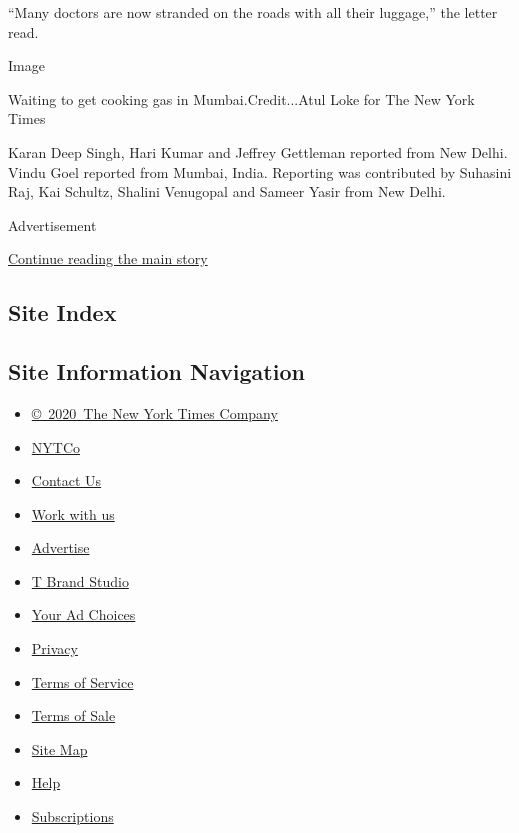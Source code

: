 ``Many doctors are now stranded on the roads with all their luggage,''
the letter read.

Image

Waiting to get cooking gas in Mumbai.Credit...Atul Loke for The New York
Times

Karan Deep Singh, Hari Kumar and Jeffrey Gettleman reported from New
Delhi. Vindu Goel reported from Mumbai, India. Reporting was contributed
by Suhasini Raj, Kai Schultz, Shalini Venugopal and Sameer Yasir from
New Delhi.

Advertisement

\protect\hyperlink{after-bottom}{Continue reading the main story}

\hypertarget{site-index}{%
\subsection{Site Index}\label{site-index}}

\hypertarget{site-information-navigation}{%
\subsection{Site Information
Navigation}\label{site-information-navigation}}

\begin{itemize}
\tightlist
\item
  \href{https://help.nytimes.com/hc/en-us/articles/115014792127-Copyright-notice}{©~2020~The
  New York Times Company}
\end{itemize}

\begin{itemize}
\tightlist
\item
  \href{https://www.nytco.com/}{NYTCo}
\item
  \href{https://help.nytimes.com/hc/en-us/articles/115015385887-Contact-Us}{Contact
  Us}
\item
  \href{https://www.nytco.com/careers/}{Work with us}
\item
  \href{https://nytmediakit.com/}{Advertise}
\item
  \href{http://www.tbrandstudio.com/}{T Brand Studio}
\item
  \href{https://www.nytimes.com/privacy/cookie-policy\#how-do-i-manage-trackers}{Your
  Ad Choices}
\item
  \href{https://www.nytimes.com/privacy}{Privacy}
\item
  \href{https://help.nytimes.com/hc/en-us/articles/115014893428-Terms-of-service}{Terms
  of Service}
\item
  \href{https://help.nytimes.com/hc/en-us/articles/115014893968-Terms-of-sale}{Terms
  of Sale}
\item
  \href{https://spiderbites.nytimes.com}{Site Map}
\item
  \href{https://help.nytimes.com/hc/en-us}{Help}
\item
  \href{https://www.nytimes.com/subscription?campaignId=37WXW}{Subscriptions}
\end{itemize}
